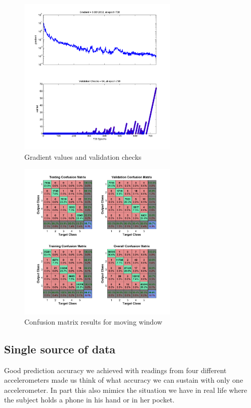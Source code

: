 \documentclass{article}
\begin{document}
\begin{figure}
\centering
\includegraphics[width=3in]{14_train}
\caption{Gradient values and validation checks}
\label{14_train}
\end{figure}

\begin{figure}
\centering
\includegraphics[width=3in]{14_confusion}
\caption{Confusion matrix results for moving window}
\label{14_confusion}
\end{figure}


\subsection{Single source of data} 
\label{single_acc}
Good prediction accuracy we achieved with readings from four different accelerometers made us think of what accuracy we can sustain with 
only one accelerometer. In part this also mimics the situation we have in real life where the subject holds a phone in his hand or in her
pocket. 


\end{document}
